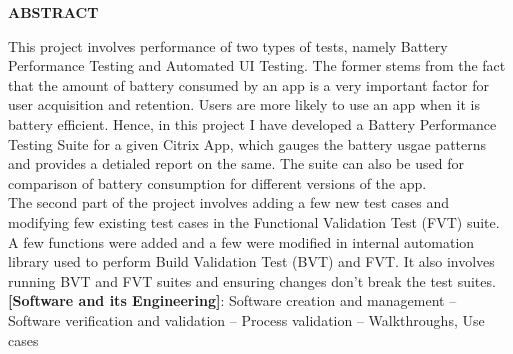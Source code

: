 \setlength\parindent{0pt}
\begin{center}
\large{\textbf{ABSTRACT}}\\
\vspace{1cm}
\end{center}
This project involves performance of two types of tests, namely Battery Performance Testing and Automated UI Testing. The former stems from the fact that the amount of battery consumed by an app is a very important factor for user acquisition and retention. Users are more likely to use an app when it is battery efficient. Hence, in this project I have developed a Battery Performance Testing Suite for a given Citrix App, which gauges the battery usgae patterns and provides a detialed report on the same. The suite can also be used for comparison of battery consumption for different versions of the app.\\

The second part of the project involves adding a few new test cases and modifying few existing test cases in the Functional Validation Test (FVT) suite. A few functions were added and a few were modified in internal automation library used to perform Build Validation Test (BVT) and FVT. It also involves running BVT and FVT suites and ensuring changes don't break the test suites.\\

\textbf{[Software and its Engineering]}:   Software creation and management -- Software verification and validation --  Process validation -- Walkthroughs, Use cases